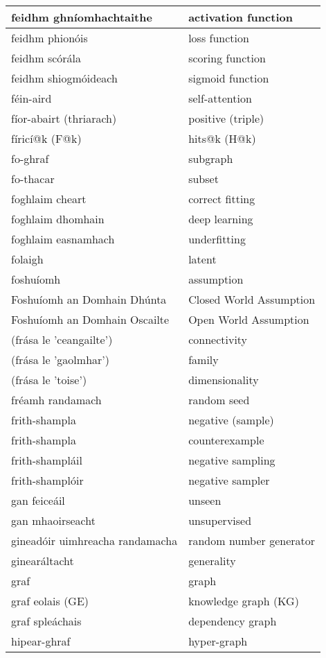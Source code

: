 \begin{longtable}{|l|l|}
		feidhm ghníomhachtaithe&activation function\\ \hline 
		feidhm phionóis&loss function\\ \hline 
		feidhm scórála&scoring function\\ \hline 
		feidhm shiogmóideach&sigmoid function\\ \hline 
		féin-aird&self-attention\\ \hline 
		fíor-abairt (thriarach)&positive (triple)\\ \hline 
		fíricí@k (F@k)&hits@k (H@k)\\ \hline 
		fo-ghraf&subgraph\\ \hline 
		fo-thacar&subset\\ \hline 
		foghlaim cheart&correct fitting\\ \hline 
		foghlaim dhomhain&deep learning\\ \hline 
		foghlaim easnamhach&underfitting\\ \hline 
		folaigh&latent\\ \hline 
		foshuíomh&assumption\\ \hline 
		Foshuíomh an Domhain Dhúnta&Closed World Assumption\\ \hline 
		Foshuíomh an Domhain Oscailte&Open World Assumption\\ \hline 
		(frása le 'ceangailte')&connectivity\\ \hline 
		(frása le 'gaolmhar')&family\\ \hline 
		(frása le 'toise')&dimensionality\\ \hline 
		fréamh randamach&random seed\\ \hline 
		frith-shampla&negative (sample)\\ \hline 
		frith-shampla&counterexample\\ \hline 
		frith-shampláil&negative sampling\\ \hline 
		frith-shamplóir&negative sampler\\ \hline 
		gan feiceáil&unseen\\ \hline 
		gan mhaoirseacht&unsupervised\\ \hline 
		gineadóir uimhreacha randamacha&random number generator\\ \hline 
		ginearáltacht&generality\\ \hline 
		graf&graph\\ \hline 
		graf eolais (GE)&knowledge graph (KG)\\ \hline 
		graf spleáchais&dependency graph\\ \hline 
		hipear-ghraf&hyper-graph\\ \hline 

\end{longtable}

